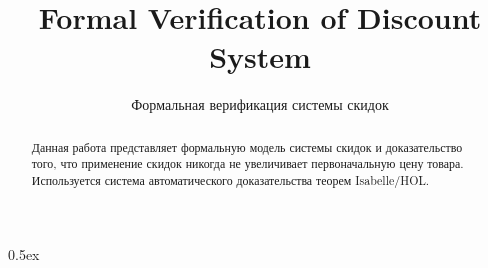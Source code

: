 \documentclass[11pt,a4paper]{article}
\begin{document}
\title{Formal Verification of Discount System}
\author{Формальная верификация системы скидок}
\maketitle

\begin{abstract}
Данная работа представляет формальную модель системы скидок и доказательство того, 
что применение скидок никогда не увеличивает первоначальную цену товара.
Используется система автоматического доказательства теорем Isabelle/HOL.
\end{abstract}

\tableofcontents

\parindent 0pt\parskip 0.5ex



%
%
\end{document}
